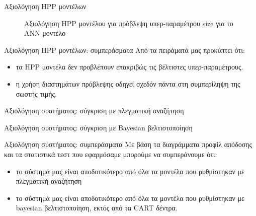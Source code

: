 \documentclass{beamer}
\begin{document}
  \begin{frame}{Αξιολόγηση HPP μοντέλων} 
  	\begin{figure}[!htb]
  Αξιολόγηση HPP μοντέλου για πρόβλεψη υπερ-παραμέτρου size για το ΑΝΝ μοντέλο
  		\scalebox{0.6}{
  			}
  	\end{figure}
  \end{frame}
  \begin{frame}{Αξιολόγηση HPP μοντέλων: συμπεράσματα}
  	Από τα πειράματά μας προκύπτει ότι:
  	\begin{itemize}
  		\item τα HPP μοντέλα δεν προβλέπουν επακριβώς τις βέλτιστες υπερ-παραμέτρους.
  		\item η χρήση διαστημάτων πρόβλεψης οδηγεί σχεδόν πάντα στη συμπερίληψη της σωστής τιμής.
  	\end{itemize}
  \end{frame}
  \begin{frame}{Αξιολόγηση συστήματος: σύγκριση με πλεγματική αναζήτηση} 
  	\begin{figure}[!htb]
  		\scalebox{0.5}{
  			}
  	\end{figure}
  \end{frame}
    \begin{frame}{Αξιολόγηση συστήματος: σύγκριση με Bayesian βελτιστοποίηση} 
    	\begin{figure}[!htb]
    		\scalebox{0.5}{
    			}
    	\end{figure}
    \end{frame}
    \begin{frame}{Αξιολόγηση συστήματος: συμπεράσματα}
    	Με βάση τα διαγράμματα προφίλ απόδοσης και τα στατιστικά τεστ που εφαρμόσαμε μπορούμε να συμπεράνουμε ότι:
    	\begin{itemize}
    		\item το σύστημά μας είναι αποδοτικότερο από όλα τα μοντέλα που ρυθμίστηκαν με πλεγματική αναζήτηση
    		\item το σύστημά μας είναι αποδοτικότερο από όλα τα μοντέλα που ρυθμίστηκαν με bayesian βελτιστοποίηση, εκτός από τα CART δέντρα.
    	\end{itemize}
    \end{frame}
\end{document}
